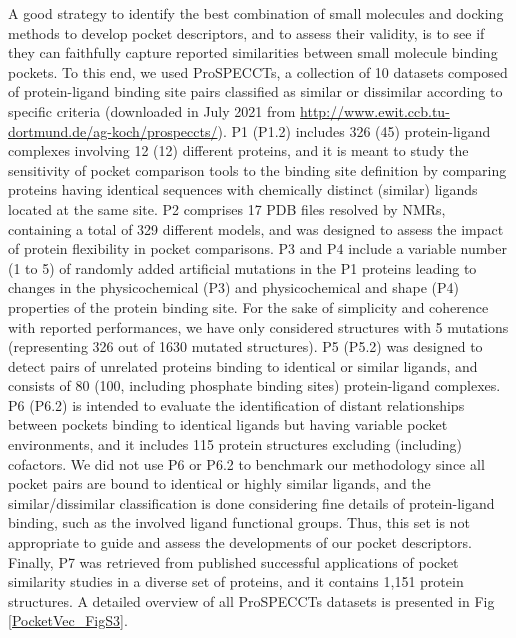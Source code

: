 A good strategy to identify the best combination of small molecules and docking methods to develop pocket descriptors, and to assess their validity, is to see if they can faithfully capture reported similarities between small molecule binding pockets. To this end, we used ProSPECCTs\cite{ehrt_benchmark_2018}, a collection of 10 datasets composed of protein-ligand binding site pairs classified as similar or dissimilar according to specific criteria (downloaded in July 2021 from \href{http://www.ewit.ccb.tu-dortmund.de/ag-koch/prospeccts/}{http://www.ewit.ccb.tu-dortmund.de/ag-koch/prospeccts/}). P1 (P1.2) includes 326 (45) protein-ligand complexes involving 12 (12) different proteins, and it is meant to study the sensitivity of pocket comparison tools to the binding site definition by comparing proteins having identical sequences with chemically distinct (similar) ligands located at the same site. P2 comprises 17 PDB files resolved by NMRs, containing a total of 329 different models, and was designed to assess the impact of protein flexibility in pocket comparisons. P3 and P4 include a variable number (1 to 5) of randomly added artificial mutations in the P1 proteins leading to changes in the physicochemical (P3) and physicochemical and shape (P4) properties of the protein binding site. For the sake of simplicity and coherence with reported performances, we have only considered structures with 5 mutations (representing 326 out of 1630 mutated structures). P5 (P5.2) was designed to detect pairs of unrelated proteins binding to identical or similar ligands, and consists of 80 (100, including phosphate binding sites) protein-ligand complexes\cite{kahraman_shape_2007}. P6 (P6.2) is intended to evaluate the identification of distant relationships between pockets binding to identical ligands but having variable pocket environments\cite{barelier_recognition_2015}, and it includes 115 protein structures excluding (including) cofactors. We did not use P6 or P6.2 to benchmark our methodology since all pocket pairs are bound to identical or highly similar ligands, and the similar/dissimilar classification is done considering fine details of protein-ligand binding, such as the involved ligand functional groups. Thus, this set is not appropriate to guide and assess the developments of our pocket descriptors. Finally, P7 was retrieved from published successful applications of pocket similarity studies in a diverse set of proteins, and it contains 1,151 protein structures. A detailed overview of all ProSPECCTs datasets is presented in Fig \ref{PocketVec_FigS3}.


